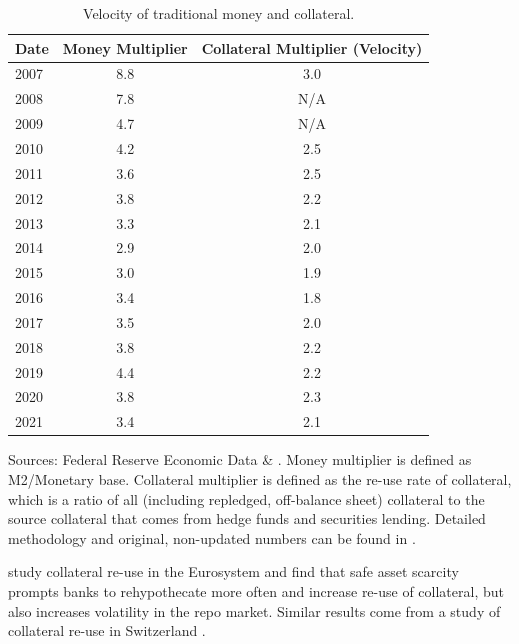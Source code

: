 \documentclass[11pt,a4paper,english,oneside]{article}
\begin{document}
\begin{table}[!h] \centering
\begin{threeparttable}
\caption{Velocity of traditional money and collateral.}
\label{table:velocity}
\begin{tabular}{l|cc}
\toprule
  Date & Money Multiplier & Collateral Multiplier (Velocity)\\
\midrule
  2007 & 8.8 & 3.0 \\
  2008 & 7.8 & N/A \\
  2009 & 4.7 & N/A \\
  2010 & 4.2 & 2.5 \\
  2011 & 3.6 & 2.5 \\
  2012 & 3.8 & 2.2 \\
  2013 & 3.3 & 2.1 \\
  2014 & 2.9 & 2.0 \\
  2015 & 3.0 & 1.9 \\
  2016 & 3.4 & 1.8 \\
  2017 & 3.5 & 2.0 \\
  2018 & 3.8 & 2.2 \\
  2019 & 4.4 & 2.2 \\
  2020 & 3.8 & 2.3 \\
  2021 & 3.4 & 2.1 \\
\bottomrule
\end{tabular}
  Sources: Federal Reserve Economic Data \& \citet{singh2022}. Money multiplier is defined as M2/Monetary base. Collateral multiplier is defined as the re-use rate of collateral, which is a ratio of all (including repledged, off-balance sheet) collateral to the source collateral that comes from hedge funds and securities lending. Detailed methodology and original, non-updated numbers can be found in \citet{singh2011b}.
\end{threeparttable}
\end{table}

\citet{jank2021} study collateral re-use in the Eurosystem and find that safe asset scarcity prompts banks to rehypothecate more often and increase re-use of collateral, but also increases volatility in the repo market. Similar results come from a study of collateral re-use in Switzerland \citep{fuhrer2016}. 
\end{document}
